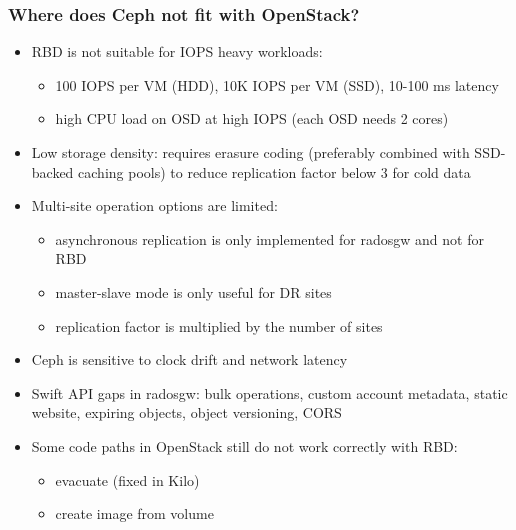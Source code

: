 \documentclass[hyperref=unicode,utf8,xcolor=pst,aspectratio=169]{beamer}
\begin{document}
\begin{frame}
	\frametitle{Where does Ceph not fit with OpenStack?}
	\begin{itemize}
		\item RBD is not suitable for {\color{mirantisred}IOPS heavy
			workloads}:
			\begin{itemize}
				\item 100 IOPS per VM (HDD),
					10K IOPS per VM (SSD),
					10-100 ms latency
				\item high CPU load on OSD at high IOPS
					(each OSD needs 2 cores)
			\end{itemize}
		\item Low {\color{mirantisred}storage density}: requires
			erasure coding (preferably combined with SSD-backed
			caching pools) to reduce replication factor below 3 for
			cold data
		\item {\color{mirantisred}Multi-site operation} options are
			limited:
			\begin{itemize}
				\item asynchronous replication is only
					implemented for radosgw and not for
					RBD
				\item master-slave mode is only useful for DR
					sites
				\item replication factor is multiplied by the
					number of sites
			\end{itemize}
		\item Ceph is sensitive to {\color{mirantisred}clock drift}
			and {\color{mirantisred}network latency}
		\item {\color{mirantisred}Swift API} gaps in radosgw: bulk
			operations, custom account metadata, static website,
			expiring objects, object versioning, CORS
		\item Some code paths in OpenStack still do not work correctly
			with RBD:
			\begin{itemize}
				\item evacuate (fixed in Kilo)
				\item create image from volume
			\end{itemize}
	\end{itemize}
\end{frame}
\end{document}
